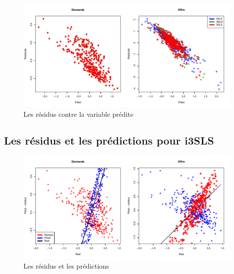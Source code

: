 \documentclass[11pt,]{article}
\begin{document}
\FloatBarrier

\begin{figure}[!htbp]

{\centering \includegraphics{note2pres_files/figure-latex/unnamed-chunk-61-1} 

}

\caption{Les résidus contre la variable prédite}\label{fig:unnamed-chunk-61}
\end{figure}

\FloatBarrier

\hypertarget{les-residus-et-les-predictions-pour-i3sls}{%
\subsection{Les résidus et les prédictions pour
i3SLS}\label{les-residus-et-les-predictions-pour-i3sls}}

\FloatBarrier

\begin{figure}[!htbp]

{\centering \includegraphics{note2pres_files/figure-latex/unnamed-chunk-62-1} 

}

\caption{Les résidus et les prédictions}\label{fig:unnamed-chunk-62}
\end{figure}
\end{document}

